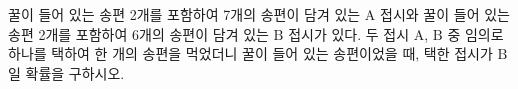 꿀이 들어 있는 송편 2개를 포함하여 7개의 송편이 담겨 있는 $\mathrm{A}$ 접시와 꿀이 들어 있는 송편 2개를 포함하여 6개의 송편이 담겨 있는 $\mathrm{B}$ 접시가 있다. 두 접시 $\mathrm{A}$, $\mathrm{B}$ 중 임의로 하나를 택하여 한 개의 송편을 먹었더니 꿀이 들어 있는 송편이었을 때, 택한 접시가 $\mathrm{B}$일 확률을 구하시오.
